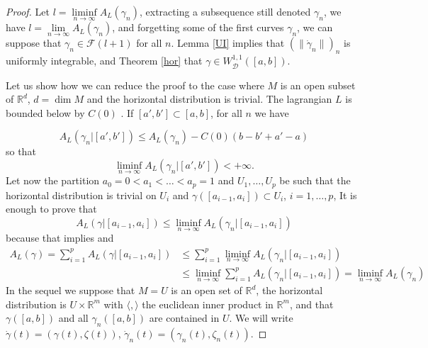 \documentclass[10pt,a4paper]{amsart}
\newcommand{\R}{\mathbb R}
\newcommand{\cD}{\mathcal D}
\newcommand{\cW}{W^{1,1}}
\newcommand{\cWD}{\cW_\cD}
\newcommand{\cF}{\mathcal F}
\newcommand{\ga}{\gamma}
\newcommand{\dga}{\dot\gamma}
\begin{document}
\begin{proof}
  
Let $l=\liminf\limits_{n\to\infty}A_L(\ga_n)$,  extracting a subsequence
still denoted $\ga_n$, we have  $l=\lim\limits_{n\to\infty}A_L(\ga_n)$, and forgetting some of the first curves $\ga_n$, 
we can suppose that $\ga_n\in\cF(l+1)$ for all $n$. 
Lemma \ref{UI} implies that $(\|\dga_n\|)_n$ 
is uniformly integrable, and Theorem \ref{hor} that $\ga\in\cWD([a,b])$.
  
Let us show how we can reduce the proof to the case where 
$M$ is an open subset of $\R^d$,  $d =\dim M$ and the horizontal 
distribution is trivial. The lagrangian $L$ is bounded
below by $C(0)$ . If $[a',b']\subset[a,b]$, for all $n$ we have

\[A_L(\ga_n|[a',b'])\le
  A_L(\ga_n)-C(0)(b-b'+a'-a)\]
so that
\[\liminf_{n\to\infty}A_L(\ga_n|[a',b'])<+\infty.\]
Let now the partition $a_0 = 0 < a_1 < \ldots < a_p = 1$ and
$U_1, \ldots, U_p$ be such that
the horizontal distribution is trivial on $U_i$  and
$\ga([a_{i-1},a_i])\subset U_i$, $i=1,\ldots,p$,
It is enough to prove that  
\[A_L(\ga|[a_{i-1},a_i])\le \liminf_{n\to\infty}A_L(\ga_n|[a_{i-1},a_i])\]
because that implies and 
\begin{align*}
  A_L(\ga) =\sum_{i=1}^pA_L(\ga|[a_{i-1},a_i]) &\le
\sum_{i=1}^p\liminf _{n\to\infty} A_L(\ga_n|[a_{i-1},a_i])\\
&\le \liminf_{n\to\infty}\sum_{i=1}^pA_L(\ga_n|[a_{i-1},a_i])=\liminf_{n\to\infty}A_L(\ga_n)
\end{align*}
In the sequel we suppose that $M=U$ is an open set of $\R^d$, the
horizontal distribution is $U\times\R^m$ with $\langle ,\rangle$ the
euclidean inner product in $\R^m$, and that $\ga([a,b])$ and 
all $\ga_n([a,b])$ are contained in $U$.
We will write $\dga(t)=(\ga(t), \zeta(t))$, $\dga_n(t)=(\ga_n(t), \zeta_n(t))$.


\end{proof}
\end{document}
